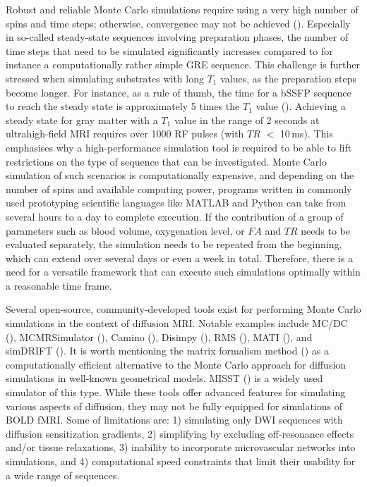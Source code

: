 Robust and reliable Monte Carlo simulations require using a very high number of spins and time steps; otherwise, convergence may not be achieved (\cite{hall2009convergence}). Especially in so-called steady-state sequences involving preparation phases, the number of time steps that need to be simulated significantly increases compared to for instance a computationally rather simple GRE sequence. This challenge is further stressed when simulating substrates with long \(T_1\) values, as the preparation steps become longer. For instance, as a rule of thumb, the time for a bSSFP sequence to reach the steady state is approximately 5 times the \(T_1\) value (\cite{bieri2013fundamentals}). Achieving a steady state for gray matter with a \(T_1\) value in the range of 2 seconds at ultrahigh-field MRI requires over 1000 RF pulses (with \(TR\) $<$ 10\,ms). This emphasises why a high-performance simulation tool is required to be able to lift restrictions on the type of sequence that can be investigated. Monte Carlo simulation of such scenarios is computationally expensive, and depending on the number of spins and available computing power, programs written in commonly used prototyping scientific languages like MATLAB and Python can take from several hours to a day to complete execution. If the contribution of a group of parameters such as blood volume, oxygenation level, or \(FA\) and \(TR\) needs to be evaluated separately, the simulation needs to be repeated from the beginning, which can extend over several days or even a week in total. Therefore, there is a need for a versatile framework that can execute such simulations optimally within a reasonable time frame.


Several open-source, community-developed tools exist for performing Monte Carlo simulations in the context of diffusion MRI. Notable examples include MC/DC (\cite{rafael2020robust}), MCMRSimulator (\cite{cottaar_2023_10067194}), Camino (\cite{cook2006camino}), Disimpy (\cite{kerkela2020disimpy}), RMS (\cite{lee2021realistic}), MATI (\cite{Xu2024mati}), and simDRIFT (\cite{blum2023simulated}). It is worth mentioning the matrix formalism method (\cite{callaghan1997simple}) as a computationally efficient alternative to the Monte Carlo approach for diffusion simulations in well-known geometrical models. MISST (\cite{ianucs2016microstructure}) is a widely used simulator of this type. While these tools offer advanced features for simulating various aspects of diffusion, they may not be fully equipped for simulations of BOLD fMRI. Some of limitations are: 1) simulating only DWI sequences with diffusion sensitization gradients, 2) simplifying by excluding off-resonance effects and/or tissue relaxations, 3) inability to incorporate microvascular networks into simulations, and 4) computational speed constraints that limit their usability for a wide range of sequences.

